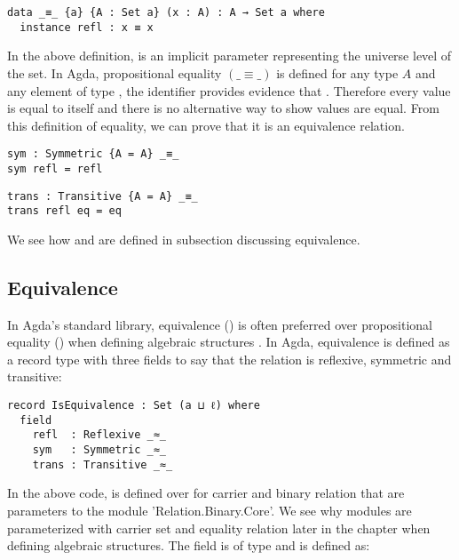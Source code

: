 \begin{verbatim}
data _≡_ {a} {A : Set a} (x : A) : A → Set a where
  instance refl : x ≡ x
\end{verbatim}

In the above definition,  is an implicit parameter representing the
universe level of the set. In Agda, propositional equality $(\_ \equiv\_ )$ is
defined for any type $A$ and any element  of type , the
identifier  provides evidence that . Therefore every
value is equal to itself and there is no alternative way to show values are
equal. From this definition of equality, we can prove that it is an equivalence
relation.

\begin{verbatim}
sym : Symmetric {A = A} _≡_
sym refl = refl
\end{verbatim}

\begin{verbatim}
trans : Transitive {A = A} _≡_
trans refl eq = eq
\end{verbatim}

We see how  and  are defined in subsection
discussing equivalence.

\subsection{Equivalence}
In Agda's standard library, equivalence () is often preferred over
propositional equality () when defining algebraic structures
\cite{musa}. In Agda, equivalence is defined as a record type with three fields
to say that the relation is reflexive, symmetric and transitive:

\begin{verbatim}
record IsEquivalence : Set (a ⊔ ℓ) where
  field
    refl  : Reflexive _≈_
    sym   : Symmetric _≈_
    trans : Transitive _≈_
\end{verbatim}

In the above code,  is defined over for carrier  and binary relation  that are parameters to the
module 'Relation.Binary.Core'. We see why modules are parameterized with carrier
set and equality relation later in the chapter when defining algebraic
structures. The field  is of type  and is
defined as:

